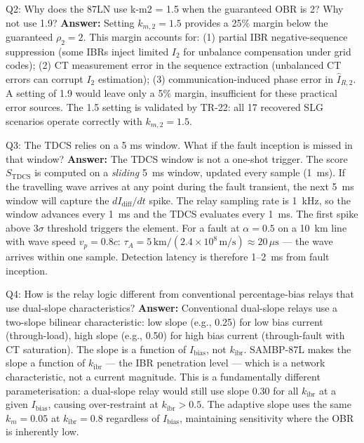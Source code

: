 \documentclass[12pt,a4paper]{article}
\newcommand{\kibr}{k_\mathrm{ibr}}
\begin{document}
\begin{keybox}{Q2: Why does the 87LN use k-m2 = 1.5 when the guaranteed OBR is 2? Why not use 1.9?}
\textbf{Answer:} Setting $k_{m,2} = 1.5$ provides a 25\% margin below the guaranteed $\rho_2 = 2$. This margin accounts for: (1) partial IBR negative-sequence suppression (some IBRs inject limited $I_2$ for unbalance compensation under grid codes); (2) CT measurement error in the sequence extraction (unbalanced CT errors can corrupt $I_2$ estimation); (3) communication-induced phase error in $\hat{I}_{R,2}$. A setting of 1.9 would leave only a 5\% margin, insufficient for these practical error sources. The 1.5 setting is validated by TR-22: all 17 recovered SLG scenarios operate correctly with $k_{m,2} = 1.5$.
\end{keybox}

\begin{keybox}{Q3: The TDCS relies on a 5 ms window. What if the fault inception is missed in that window?}
\textbf{Answer:} The TDCS window is not a one-shot trigger. The score $S_\mathrm{TDCS}$ is computed on a \emph{sliding} 5~ms window, updated every sample (1~ms). If the travelling wave arrives at any point during the fault transient, the next 5~ms window will capture the $dI_\mathrm{diff}/dt$ spike. The relay sampling rate is 1~kHz, so the window advances every 1~ms and the TDCS evaluates every 1~ms. The first spike above $3\sigma$ threshold triggers the element. For a fault at $\alpha = 0.5$ on a 10~km line with wave speed $v_p = 0.8c$: $\tau_A = 5\,\mathrm{km}/(2.4\times10^8\,\mathrm{m/s}) \approx 20\,\mu\mathrm{s}$ --- the wave arrives within one sample. Detection latency is therefore 1--2~ms from fault inception.
\end{keybox}

\begin{keybox}{Q4: How is the relay logic different from conventional percentage-bias relays that use dual-slope characteristics?}
\textbf{Answer:} Conventional dual-slope relays use a two-slope bilinear characteristic: low slope (e.g., 0.25) for low bias current (through-load), high slope (e.g., 0.50) for high bias current (through-fault with CT saturation). The slope is a function of $I_\mathrm{bias}$, not $\kibr$. SAMBP-87L makes the slope a function of $\kibr$ --- the IBR penetration level --- which is a network characteristic, not a current magnitude. This is a fundamentally different parameterisation: a dual-slope relay would still use slope 0.30 for all $\kibr$ at a given $I_\mathrm{bias}$, causing over-restraint at $\kibr > 0.5$. The adaptive slope uses the same $k_m = 0.05$ at $\kibr = 0.8$ regardless of $I_\mathrm{bias}$, maintaining sensitivity where the OBR is inherently low.
\end{keybox}
\end{document}
